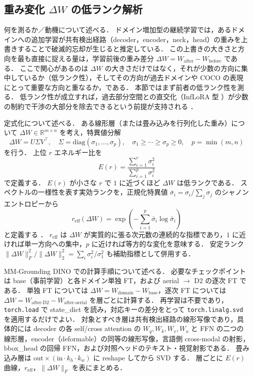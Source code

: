 \subsection{重み変化 $\Delta W$ の低ランク解析}
\label{subsec:deltaw-lowrank}

何を測るか／動機について述べる．
ドメイン増加型の継続学習では，あるドメインへの追加学習が共有検出経路（decoder，encoder，neck，head）の重みを上書きすることで破滅的忘却が生じると推定している．
この上書きの大きさと方向を最も直接に捉える量は，学習前後の重み差分 $\Delta W = W_{\mathrm{after}} - W_{\mathrm{before}}$ である．
ここで関心があるのは $\Delta W$ の大きさだけではなく，それが少数の方向に集中しているか（低ランク性），そしてその方向が過去ドメインや COCO の表現にとって重要な方向と重なるか，である．
本節ではまず前者の低ランク性を測る．
低ランク性が成立すれば，過去部分空間との直交化（InfLoRA 型 \cite{inflora}）が少数の制約で干渉の大部分を除去できるという前提が支持される \cite{intrinsicdim}．

定式化について述べる．
ある線形層（または畳み込みを行列化した重み）について $\Delta W \in \mathbb{R}^{m \times n}$ を考え，特異値分解
\begin{equation}
\Delta W = U \Sigma V^{\top}, \quad \Sigma = \mathrm{diag}(\sigma_1, \ldots, \sigma_p), \quad \sigma_1 \geq \cdots \geq \sigma_p \geq 0, \quad p = \min(m,n)
\end{equation}
を行う．
上位 $r$ エネルギー比を
\begin{equation}
E(r) = \frac{\sum_{i=1}^{r} \sigma_i^2}{\sum_{i=1}^{p} \sigma_i^2}
\end{equation}
で定義する．
$E(r)$ が小さな $r$ で $1$ に近づくほど $\Delta W$ は低ランクである．
スペクトルの一様性を表す実効ランクを，正規化特異値 $\bar{\sigma}_i = \sigma_i / \sum_j \sigma_j$ のシャノンエントロピーから
\begin{equation}
r_{\mathrm{eff}}(\Delta W) = \exp\!\left( - \sum_{i=1}^{p} \bar{\sigma}_i \log \bar{\sigma}_i \right)
\end{equation}
と定義する \cite{intrinsicdim}．
$r_{\mathrm{eff}}$ は $\Delta W$ が実質的に張る次元数の連続的な指標であり，$1$ に近ければ単一方向への集中，$p$ に近ければ等方的な変化を意味する．
安定ランク $\|\Delta W\|_F^2 / \|\Delta W\|_2^2 = \sum_i \sigma_i^2 / \sigma_1^2$ も補助指標として併用する．

MM-Grounding DINO での計算手順について述べる．
必要なチェックポイントは base（事前学習）と各ドメイン単独 FT，および aerial $\rightarrow$ D2 の逐次 FT である．
単独 FT については $\Delta W = W_{\mathrm{domain}} - W_{\mathrm{base}}$，逐次 FT については $\Delta W = W_{\mathrm{after\text{-}D2}} - W_{\mathrm{after\text{-}aerial}}$ を層ごとに計算する．
再学習は不要であり，\verb|torch.load| で state\_dict を読み，対応キーの差分をとって \verb|torch.linalg.svd| を適用するだけでよい．
対象とすべき層は共有検出経路の線形写像であり，具体的には decoder の各 self/cross attention の $W_q, W_k, W_v, W_o$ と FFN の二つの線形層，encoder（deformable）の同等の線形写像，言語側 cross-modal の射影，bbox\_head の回帰 FFN，および対照ヘッドのテキスト・視覚射影である．
畳み込み層は $\mathrm{out} \times (\mathrm{in} \cdot k_h \cdot k_w)$ に reshape してから SVD する．
層ごとに $E(r)$ 曲線，$r_{\mathrm{eff}}$，$\|\Delta W\|_F$ を表にまとめる．

